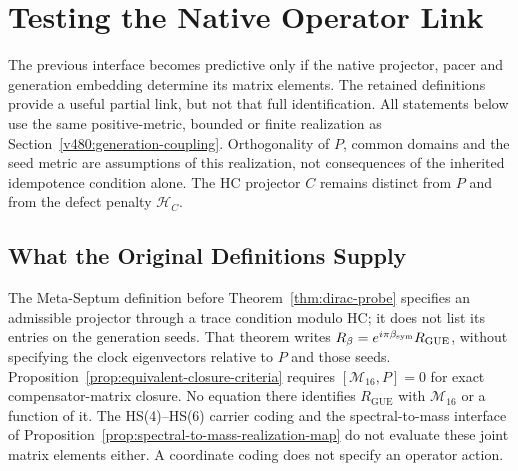 \section{Testing the Native Operator Link}
\label{v480:native-operator-link}

The previous interface becomes predictive only if the native projector,
pacer and generation embedding determine its matrix elements. The
retained definitions provide a useful partial link, but not that full
identification. All statements below use the same positive-metric,
bounded or finite realization as Section~\ref{v480:generation-coupling}.
Orthogonality of $P$, common domains and the seed metric are assumptions
of this realization, not consequences of the inherited idempotence
condition alone. The HC projector $C$ remains distinct from $P$ and
from the defect penalty $\mathcal H_C$.

\subsection{What the Original Definitions Supply}
\label{v480:native-source-link}

The Meta-Septum definition before Theorem~\ref{thm:dirac-probe}
specifies an admissible projector through a trace condition modulo HC;
it does not list its entries on the generation seeds. That theorem
writes $R_\beta=e^{i\pi\beta_{\mathrm{sym}}}R_{\mathrm{GUE}}$, without specifying
the clock eigenvectors relative to $P$ and those seeds.
Proposition~\ref{prop:equivalent-closure-criteria} requires
$[\mathcal M_{16},P]=0$ for exact compensator-matrix closure.
No equation there identifies $R_{\mathrm{GUE}}$ with
$\mathcal M_{16}$ or a function of it. The HS(4)--HS(6) carrier
coding and the spectral-to-mass interface of
Proposition~\ref{prop:spectral-to-mass-realization-map} do not
evaluate these joint matrix elements either. A coordinate coding
does not specify an operator action.

